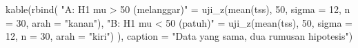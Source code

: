 \documentclass[
  indonesian,
  letterpaper,
]{book}
\newenvironment{Shaded}{\begin{snugshade}}{\end{snugshade}}
\newcommand{\AttributeTok}[1]{\textcolor[rgb]{0.40,0.45,0.13}{#1}}
\newcommand{\DecValTok}[1]{\textcolor[rgb]{0.68,0.00,0.00}{#1}}
\newcommand{\FunctionTok}[1]{\textcolor[rgb]{0.28,0.35,0.67}{#1}}
\newcommand{\NormalTok}[1]{\textcolor[rgb]{0.00,0.23,0.31}{#1}}
\newcommand{\OtherTok}[1]{\textcolor[rgb]{0.00,0.23,0.31}{#1}}
\newcommand{\StringTok}[1]{\textcolor[rgb]{0.13,0.47,0.30}{#1}}
\begin{document}
\begin{Shaded}
\begin{Highlighting}[]
\FunctionTok{kable}\NormalTok{(}\FunctionTok{rbind}\NormalTok{(}
\StringTok{"A: H1 mu \textgreater{} 50 (melanggar)"} \OtherTok{=} \FunctionTok{uji\_z}\NormalTok{(}\FunctionTok{mean}\NormalTok{(tss), }\DecValTok{50}\NormalTok{, }\AttributeTok{sigma =} \DecValTok{12}\NormalTok{, }\AttributeTok{n =} \DecValTok{30}\NormalTok{, }\AttributeTok{arah =}
 \StringTok{"kanan"}\NormalTok{),}
\StringTok{"B: H1 mu \textless{} 50 (patuh)"} \OtherTok{=} \FunctionTok{uji\_z}\NormalTok{(}\FunctionTok{mean}\NormalTok{(tss), }\DecValTok{50}\NormalTok{, }\AttributeTok{sigma =} \DecValTok{12}\NormalTok{, }\AttributeTok{n =} \DecValTok{30}\NormalTok{, }\AttributeTok{arah =}
\StringTok{"kiri"}\NormalTok{)}
\NormalTok{), }\AttributeTok{caption =} \StringTok{"Data yang sama, dua rumusan hipotesis"}\NormalTok{)}
\end{Highlighting}
\end{Shaded}
\end{document}

